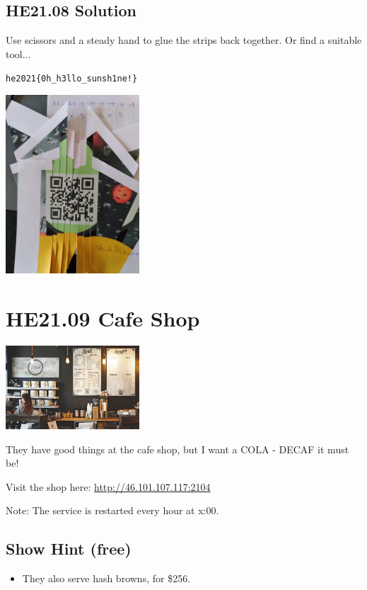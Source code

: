 \documentclass[english,a4paper,nols,noindent]{tufte-handout}
\begin{document}
\hypertarget{he21.08-solution}{%
\subsection{HE21.08 Solution}\label{he21.08-solution}}

Use scissors and a steady hand to glue the strips back together. Or find a suitable tool...

\verb+he2021{0h_h3llo_sunsh1ne!}+
\begin{marginfigure}
    \includegraphics[width=50mm]{ch08/solution08.jpg}
\end{marginfigure}

\hypertarget{he21.09}{%
\section{HE21.09 Cafe Shop}\label{he21.09}}
\begin{marginfigure}
    \includegraphics[width=50mm]{images/challenge9.jpg}
\end{marginfigure}

\noindent They have good things at the cafe shop, but I want a COLA - DECAF it must be!

Visit the shop here:
\url{http://46.101.107.117:2104}

Note: The service is restarted every hour at x:00.

\subsection{Show Hint (free)}
\begin{itemize}
\item They also serve hash browns, for \$256.
\end{itemize}
\end{document}
